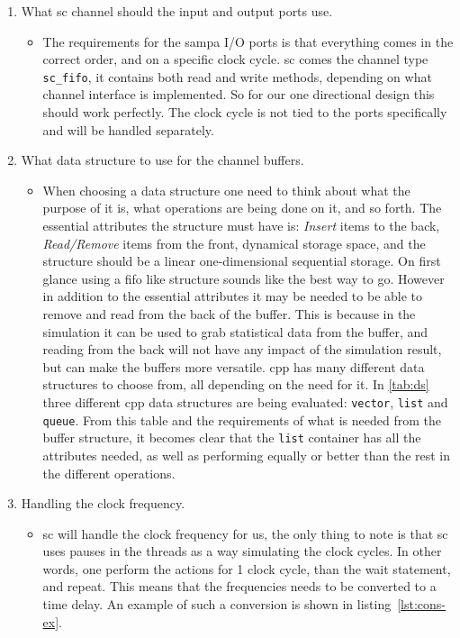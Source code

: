 \documentclass[a4paper, 12pt]{report}
\newcommand{\codeword}[1]{\texttt{#1}}
\begin{document}
\begin{enumerate}
	\item What \gls{sc} channel should the input and output ports use.
	
		\begin{itemize}
		\item The requirements for the \gls{sampa} I/O ports is that everything comes in the correct order, and on a specific clock cycle.
		\gls{sc} comes the channel type \codeword{sc\_fifo}, it contains both read and write methods, depending on what channel interface is implemented.
		So for our one directional design this should work perfectly.
		The clock cycle is not tied to the ports specifically and will be handled separately.
		\end{itemize}	
		
	\item What data structure to use for the channel buffers.
		\begin{itemize}
\item When choosing a data structure one need to think about what the purpose of it is, what operations are being done on it, and so forth.
		The essential attributes the structure must have is: \textit{Insert} items to the back, \textit{Read/Remove} items from the front, dynamical storage space, and the structure should be a linear one-dimensional sequential storage.
		On first glance using a \gls{fifo} like structure sounds like the best way to go.
		However in addition to the essential attributes it may be needed to be able to remove and read from the back of the buffer.
		This is because in the simulation it can be used to grab statistical data from the buffer, and reading from the back will not have any impact of the simulation result, but can make the buffers more versatile.
		\gls{cpp} has many different data structures to choose from, all depending on the need for it.		
		In \ref{tab:ds} three different \gls{cpp} data structures are being evaluated: \codeword{vector}, \codeword{list} and \codeword{queue}.
		From this table and the requirements of what is needed from the buffer structure, it becomes clear that the \codeword{list} container has all the attributes needed, as well as performing equally or better than the rest in the different operations.
\end{itemize}
		
	
	\item Handling the clock frequency.
		\begin{itemize}
		\item \gls{sc} will handle the clock frequency for us, the only thing to note is that \gls{sc} uses pauses in the threads as a way simulating the clock cycles.
		In other words, one perform the actions for 1 clock cycle, than the wait statement, and repeat.
		This means that the frequencies needs to be converted to a time delay.	
		An example of such a conversion is shown in listing~\ref{lst:cons-ex}.
		\end{itemize}	
	
\end{enumerate}
\end{document}
